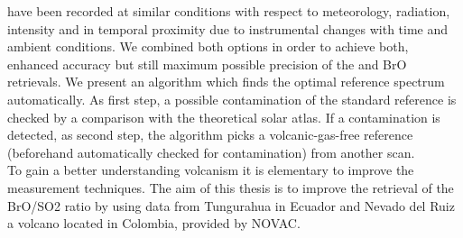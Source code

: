 have been recorded at similar conditions with respect to meteorology,
radiation, intensity and in temporal proximity due to instrumental changes
with time and ambient conditions. We combined both options in order to
achieve both, enhanced accuracy but still maximum possible precision of
the  and BrO retrievals. We present an algorithm which finds the
optimal reference spectrum automatically. As first step, a possible 
contamination of the standard reference is checked by a comparison with
the theoretical solar atlas. If a contamination is detected, as second step,
the algorithm picks a volcanic-gas-free reference (beforehand
automatically checked for contamination) from another scan.\\
%
\newline
%
To gain a better understanding volcanism it is elementary to improve the measurement techniques. The aim of this thesis is to improve the retrieval of the BrO/SO2 ratio by using data from Tungurahua in Ecuador and Nevado del Ruiz a volcano located in Colombia, provided by NOVAC.



















